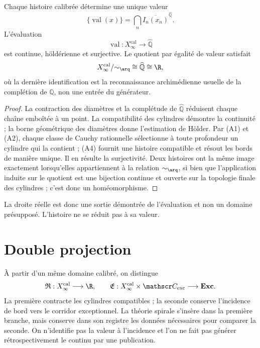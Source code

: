 \begin{theorem}
\label{thm:espiral-cierre-arquimediano-continuo-genealogico}
Chaque histoire calibrée détermine une unique valeur
\[
 \{\operatorname{val}(x)\}
 =\bigcap_n\overline{I_n(x_n)}^{\widehat{\mathbb Q}}.
\]
L'évaluation
\[
 \operatorname{val}:X_\infty^{\mathrm{cal}}\longrightarrow\widehat{\mathbb Q}
\]
est continue, höldérienne et surjective. Le quotient par égalité de valeur satisfait
\[
 X_\infty^{\mathrm{cal}}/{\sim_{\arq}}
 \cong\widehat{\mathbb Q}\cong\R,
\]
où la dernière identification est la reconnaissance archimédienne usuelle de la complétion de \(\mathbb Q\), non une entrée du générateur.
\end{theorem}
\begin{proof}
La contraction des diamètres et la complétude de \(\widehat{\mathbb Q}\) réduisent chaque chaîne emboîtée à un point. La compatibilité des cylindres démontre la continuité ; la borne géométrique des diamètres donne l'estimation de Hölder. Par (A1) et (A2), chaque classe de Cauchy rationnelle sélectionne à toute profondeur un cylindre qui la contient ; (A4) fournit une histoire compatible et résout les bords de manière unique. Il en résulte la surjectivité. Deux histoires ont la même image exactement lorsqu'elles appartiennent à la relation \(\sim_{\arq}\), si bien que l'application induite sur le quotient est une bijection continue et ouverte sur la topologie finale des cylindres ; c'est donc un homéomorphisme.
\end{proof}

La droite réelle est donc une sortie démontrée de l'évaluation et non un domaine présupposé. L'histoire ne se réduit pas à sa valeur.

\section{Double projection}

À partir d'un même domaine calibré, on distingue
\[
 \mathfrak R:X_\infty^{\mathrm{cal}}\longrightarrow\R,
 \qquad
 \mathfrak E:X_\infty^{\mathrm{cal}}\times\mathscr C_{\mathrm{exc}}
 \longrightarrow\mathbf{Exc}.
\]
La première contracte les cylindres compatibles ; la seconde conserve l'incidence de bord vers le corridor exceptionnel. La théorie spirale s'insère dans la première branche, mais conserve dans son registre les données nécessaires pour comparer la seconde. On n'identifie pas la valeur à l'incidence et l'on ne fait pas générer rétrospectivement le continu par une publication.

